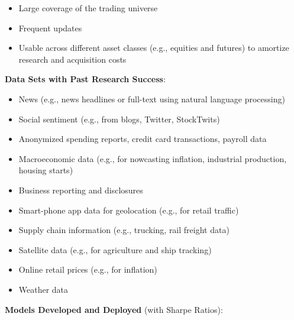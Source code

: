 \documentclass[11pt, letterpaper]{article}
\begin{document}
  \begin{itemize}
    \item Large coverage of the trading universe

    \item Frequent updates

    \item Usable across different asset classes (e.g., equities and
      futures) to amortize research and acquisition costs
  \end{itemize}

  \textbf{Data Sets with Past Research Success}:

  \begin{itemize}
    \item News (e.g., news headlines or full-text using natural language
      processing)

    \item Social sentiment (e.g., from blogs, Twitter, StockTwits)

    \item Anonymized spending reports, credit card transactions, payroll
      data

    \item Macroeconomic data (e.g., for nowcasting inflation, industrial
      production, housing starts)

    \item Business reporting and disclosures

    \item Smart-phone app data for geolocation (e.g., for retail traffic)

    \item Supply chain information (e.g., trucking, rail freight data)

    \item Satellite data (e.g., for agriculture and ship tracking)

    \item Online retail prices (e.g., for inflation)

    \item Weather data
  \end{itemize}

  \textbf{Models Developed and Deployed} (with Sharpe Ratios):
\end{document}
